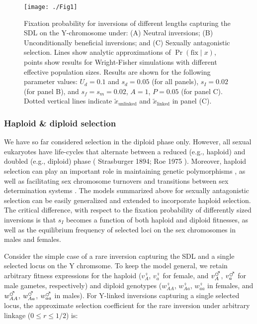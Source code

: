 \documentclass{article}
\newcommand\hl[1]{%
  \bgroup
  \hskip0pt\color{blue!80!black}%
  #1%
  \egroup
}
\begin{document}
 \begin{figure}[htbp]
 \centering
 \texttt{[image: ./Fig1]}
 \caption{Fixation probability for inversions of different lengths capturing the SDL on the Y-chromosome under: (A) Neutral inversions; (B) Unconditionally beneficial inversions; and (C) Sexually antagonistic selection. Lines show analytic approximations of $\Pr(\text{fix} \mid x)$, points show results for Wright-Fisher simulations with different effective population sizes. Results are shown for the following parameter values: $U_d = 0.1$ and $s_d = 0.05$ (for all panels), $s_I = 0.02$ (for panel B), and $s_f = s_m = 0.02$, $A = 1$, $P = 0.05$ (for panel C). Dotted vertical lines indicate $\tilde{x}_{\text{unlinked}}$ and $\tilde{x}_{\text{linked}}$ in panel (C).}
 \label{fig:fixProbFigText}
 \end{figure}
\vspace{1cm}

\subsubsection*{Haploid \& diploid selection}

We have so far considered selection in the diploid phase only. However, all sexual eukaryotes have life-cycles that alternate between a reduced (e.g., haploid) and doubled (e.g., diploid) phase (\hl{Strasburger 1894; Roe 1975}). Moreover, haploid selection can play an important role in maintaining genetic polymorphisms \citep{ImmlerOtto2011}, as well as facilitating sex chromosome turnovers and transitions between sex determination systems \citep{OttoScottOsmond2018}. The models summarized above for sexually antagonistic selection can be easily generalized and extended to incorporate haploid selection. The critical difference, with respect to the fixation probability of differently sized inversions is that $s_I$ becomes a function of both haploid and diploid fitnesses, as well as the equilibrium frequency of selected loci on the sex chromosomes in males and females. 

Consider the simple case of a rare inversion capturing the SDL and a single selected locus on the Y chromsome. To keep the model general, we retain arbitrary fitness expressions for the haploid ($v^{\female}_{A}$, $v^{\female}_{a}$ for female, and $v^{\mars}_{A}$, $v^{\mars}_{a}$ for male gametes, respectively) and diploid genotypes ($w^{\female}_{AA}$, $w^{\female}_{Aa}$, $w^{\female}_{aa}$ in females, and $w^{\mars}_{AA}$, $w^{\mars}_{Aa}$, $w^{\mars}_{aa}$ in males). For Y-linked inversions capturing a single selected locus, the approximate selection coefficient for the rare inversion under arbitrary linkage ($0 \leq r \leq 1/2$) is:
\end{document}
